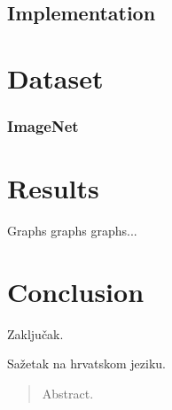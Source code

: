 \documentclass[times, utf8, diplomski]{fer}
\begin{document}
\section{Implementation}

\chapter{Dataset}
\subsection{ImageNet}

\chapter{Results}
Graphs graphs graphs...

\chapter{Conclusion}
Zaključak.





\begin{sazetak}
Sažetak na hrvatskom jeziku.

\end{sazetak}

\begin{abstract}
Abstract.

\end{abstract}
\end{document}
